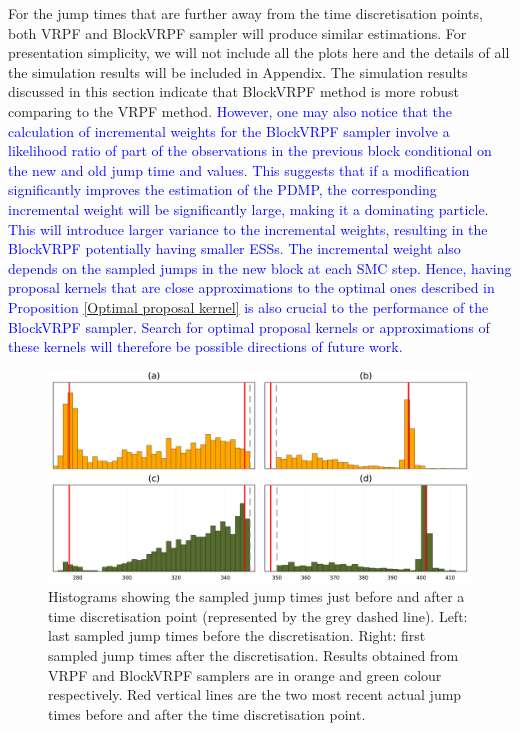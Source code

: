 \documentclass[12pt,a4paper]{article}
\begin{document}
For the jump times that are further away from the time discretisation points, both VRPF and BlockVRPF sampler will produce similar estimations. For presentation simplicity, we will not include all the plots here and the details of all the simulation results will be included in Appendix. The simulation results discussed in this section indicate that BlockVRPF method is more robust comparing to the VRPF method. \textcolor{blue}
{However, one may also notice that the calculation of incremental weights for the BlockVRPF sampler involve a likelihood ratio of part of the observations in the previous block conditional on the new and old jump time and values. This suggests that if a modification significantly improves the estimation of the PDMP, the corresponding incremental weight will be significantly large, making it a dominating particle. This will introduce larger variance to the incremental weights, resulting in the BlockVRPF potentially having smaller ESSs. The incremental weight also depends on the sampled jumps in the new block at each SMC step. Hence, having proposal kernels that are close approximations to the optimal ones described in Proposition \ref{Optimal proposal kernel} is also crucial to the performance of the BlockVRPF sampler. Search for optimal proposal kernels or approximations of these kernels will therefore be possible directions of future work.}
\begin{figure}[htb!]
    \centering
    \includegraphics[width=\textwidth]{Histogram_T350.pdf}
    \caption{Histograms showing the sampled jump times just before and after a time discretisation point (represented by the grey dashed line). Left: last sampled jump times before the discretisation. Right: first sampled jump times after the discretisation. Results obtained from VRPF and BlockVRPF samplers are in orange and green colour respectively. Red vertical lines are the two most recent actual jump times before and after the time discretisation point.}
    \label{Figure: PF simulation result 1}
\end{figure}
\end{document}
